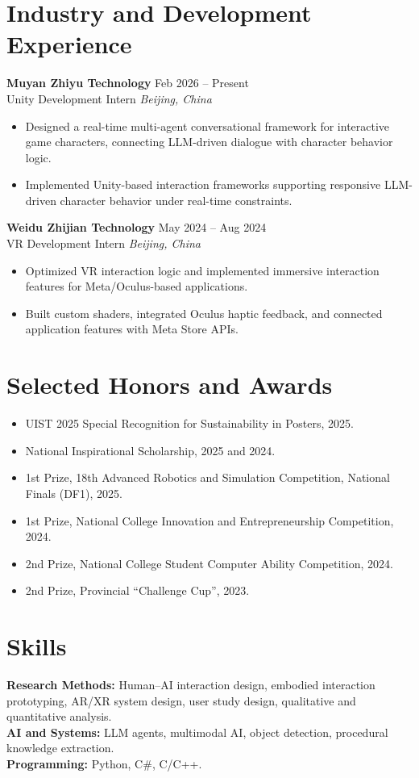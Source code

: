 \documentclass[10pt,letterpaper]{article}
\newcommand{\entry}[4]{
  \textbf{#1} \hfill #2\\
  #3 \hfill \textit{#4}
}
\begin{document}
\section{Industry and Development Experience}

\entry{Muyan Zhiyu Technology}{Feb 2026 -- Present}
{Unity Development Intern}{Beijing, China}
\begin{itemize}
    \item Designed a real-time multi-agent conversational framework for interactive game characters, connecting LLM-driven dialogue with character behavior logic.
    \item Implemented Unity-based interaction frameworks supporting responsive LLM-driven character behavior under real-time constraints.
\end{itemize}

\entry{Weidu Zhijian Technology}{May 2024 -- Aug 2024}
{VR Development Intern}{Beijing, China}
\begin{itemize}
    \item Optimized VR interaction logic and implemented immersive interaction features for Meta/Oculus-based applications.
    \item Built custom shaders, integrated Oculus haptic feedback, and connected application features with Meta Store APIs.
\end{itemize}

\section{Selected Honors and Awards}
\begin{itemize}
    \item UIST 2025 Special Recognition for Sustainability in Posters, 2025.
    \item National Inspirational Scholarship, 2025 and 2024.
    \item 1st Prize, 18th Advanced Robotics and Simulation Competition, National Finals (DF1), 2025.
    \item 1st Prize, National College Innovation and Entrepreneurship Competition, 2024.
    \item 2nd Prize, National College Student Computer Ability Competition, 2024.
    \item 2nd Prize, Provincial ``Challenge Cup'', 2023.
\end{itemize}

\section{Skills}
\textbf{Research Methods:} Human--AI interaction design, embodied interaction prototyping, AR/XR system design, user study design, qualitative and quantitative analysis.\\
\textbf{AI and Systems:} LLM agents, multimodal AI, object detection, procedural knowledge extraction.\\
\textbf{Programming:} Python, C\#, C/C++.\\
\end{document}
